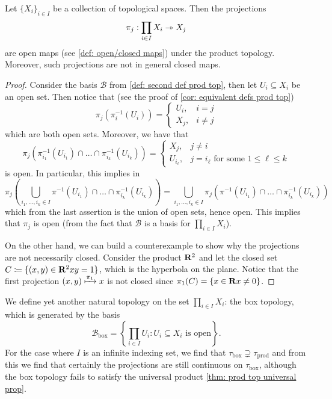 \begin{lemma}
\label{lem:projections-open-under-product-top}
  Let \(\{X_i\}_{i \in I} \) be a collection of topological spaces. Then the
  projections
  \[
    \pi_j: \prod_{i \in I} X_i \twoheadrightarrow X_j
  \]
  are open maps (see \cref{def: open/closed maps}) under the product
  topology. Moreover, such projections are not in general closed maps.
\end{lemma}

\begin{proof}
  Consider the basis \(\mathcal B\) from \cref{def: second def prod top}, then
  let \(U_i \subseteq X_i\) be an open set. Then notice that (see the proof of
  \cref{cor: equivalent defs prod top})
  \[
    \pi_j(\pi_i^{-1}(U_i)) =
    \begin{cases}
      U_i, &i = j \\
      X_j, &i \neq j
    \end{cases}
  \]
  which are both open sets. Moreover, we have that
  \[
    \pi_j \left(\pi_{i_1}^{-1}(U_{i_1}) \cap \dots \cap \pi_{i_k}^{-1}(U_{i_k})
    \right) =
    \begin{cases}
      X_j,        & j \neq i \\
      U_{i_\ell}, & j = i_\ell \text{ for some } 1 \leq \ell \leq k
    \end{cases}
  \]
  is open. In particular, this implies in
  \[
    \pi_j \left( \bigcup_{i_1, \dots, i_k \in I} \pi^{-1}(U_{i_1}) \cap \dots
    \cap \pi_{i_k}^{-1}(U_{i_k}) \right)
    =
    \bigcup_{i_1, \dots, i_k \in I} \pi_j \left( \pi^{-1}(U_{i_1}) \cap \dots
    \cap \pi_{i_k}^{-1}(U_{i_k}) \right)
  \]
  which from the last assertion is the union of open sets, hence open. This
  implies that \(\pi_j\) is open (from the fact that \(\mathcal B\) is a basis
  for \(\prod_{i \in I} X_i\)).

  On the other hand, we can build a counterexample to show why the projections
  are not necessarily closed. Consider the product \(\mathbf{R}^2\) and let the
  closed set \(C \coloneq \{(x, y) \in \mathbf{R}^2 \relax x y = 1\}\), which is the
  hyperbola on the plane. Notice that the first projection \((x, y)
  \xmapsto{\pi_1} x\) is not closed since \(\pi_1(C) = \{x \in \mathbf{R} \relax x
  \neq 0\}\).
\end{proof}

\begin{definition}
  We define yet another natural topology on the set \(\prod_{i \in I} X_i\): the
  box topology, which is generated by the basis
  \[
    \mathcal B_\text{box} = \left\{\prod_{i \in I} U_i \colon U_i \subseteq X_i
    \text{ is open}\right\}.
  \]
  For the case where \(I\) is an infinite indexing set, we find that
  \(\tau_\text{box} \supsetneq \tau_\text{prod}\) and from this we find that
  certainly the projections are still continuous on \(\tau_\text{box}\),
  although the box topology fails to satisfy the universal product \cref{thm:
  prod top universal prop}.
\end{definition}

